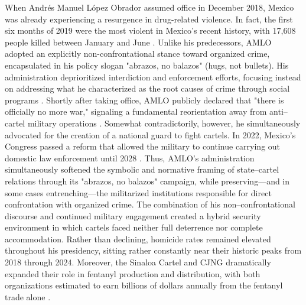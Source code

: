 \documentclass[12pt,letter,english,intoc,bibliography=totoc,index=totoc,BCOR10mm,captions=tableheading,nottitlepage,fleqn]{article}
\theoremstyle{break}
\begin{document}
When Andr\'{e}s Manuel L\'{o}pez Obrador assumed office in December 2018, Mexico was already experiencing a resurgence in drug-related violence. In fact, the first six months of 2019 were the most violent in Mexico's recent history, with 17,608 people killed between January and June \citep{mccormik2019}. Unlike his predecessors, AMLO adopted an explicitly non-confrontational stance toward organized crime, encapsulated in his policy slogan "abrazos, no balazos" (hugs, not bullets). His administration deprioritized interdiction and enforcement efforts, focusing instead on addressing what he characterized as the root causes of crime through social programs \citep{mccormik2019}. Shortly after taking office, AMLO publicly declared that "there is officially no more war," signaling a fundamental reorientation away from anti--cartel military operations \citep{quackenbush2019}. Somewhat contradictorily, however, he simultaneously advocated for the creation of a national guard to fight cartels. In 2022, Mexico's Congress passed a reform that allowed the military to continue carrying out domestic law enforcement until 2028 \citep{CriminalViolenceInMexico2025}. Thus, AMLO's administration simultaneously softened the symbolic and normative framing of state--cartel relations through its "abrazos, no balazos" campaign, while preserving---and in some cases entrenching---the militarized institutions responsible for direct confrontation with organized crime. The combination of his non--confrontational discourse and continued military engagement created a hybrid security environment in which cartels faced neither full deterrence nor complete accommodation. Rather than declining, homicide rates remained elevated throughout his presidency, sitting rather constantly near their historic peaks from 2018 through 2024. Moreover, the Sinaloa Cartel and CJNG dramatically expanded their role in fentanyl production and distribution, with both organizations estimated to earn billions of dollars annually from the fentanyl trade alone \citep{dea2024}.
\end{document}
